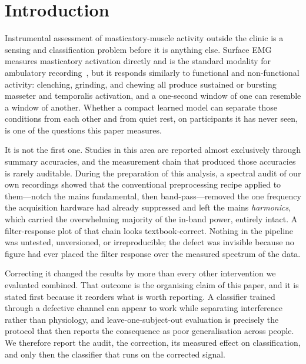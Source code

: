 \documentclass[pdflatex,sn-nature,iicol]{sn-jnl}
\begin{document}

\maketitle

\section{Introduction}

Instrumental assessment of masticatory-muscle activity outside the clinic is a sensing and classification problem before it is anything else. Surface EMG measures masticatory activation directly and is the standard modality for ambulatory recording~\cite{raez2006techniques,colonna2023electromyographic}, but it responds similarly to functional and non-functional activity: clenching, grinding, and chewing all produce sustained or bursting masseter and temporalis activation, and a one-second window of one can resemble a window of another. Whether a compact learned model can separate those conditions from each other and from quiet rest, on participants it has never seen, is one of the questions this paper measures.

It is not the first one. Studies in this area are reported almost exclusively through summary accuracies, and the measurement chain that produced those accuracies is rarely auditable. During the preparation of this analysis, a spectral audit of our own recordings showed that the conventional preprocessing recipe applied to them---notch the mains fundamental, then band-pass---removed the one frequency the acquisition hardware had already suppressed and left the mains \emph{harmonics}, which carried the overwhelming majority of the in-band power, entirely intact. A filter-response plot of that chain looks textbook-correct. Nothing in the pipeline was untested, unversioned, or irreproducible; the defect was invisible because no figure had ever placed the filter response over the measured spectrum of the data.

Correcting it changed the results by more than every other intervention we evaluated combined. That outcome is the organising claim of this paper, and it is stated first because it reorders what is worth reporting. A classifier trained through a defective channel can appear to work while separating interference rather than physiology, and leave-one-subject-out evaluation is precisely the protocol that then reports the consequence as poor generalisation across people. We therefore report the audit, the correction, its measured effect on classification, and only then the classifier that runs on the corrected signal.
\end{document}
